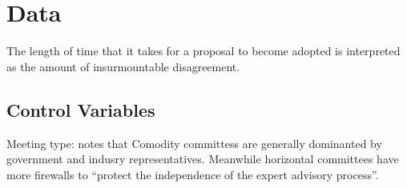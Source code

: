 


\section{Data}
The length of time that it takes for a proposal to become adopted is interpreted as the amount of insurmountable disagreement. 


\subsection{Control Variables}


Meeting type:  \citet{victor:1997} notes that Comodity committess are generally dominanted by government and indusry representatives. Meanwhile horizontal committees have more firewalls to ``protect the independence of the expert advisory process''.